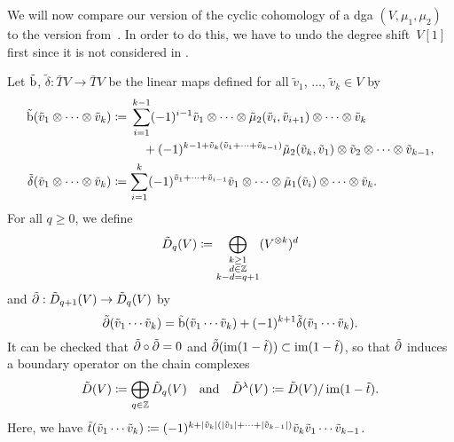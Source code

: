 \documentclass[\MainFolder/Text.tex]{subfiles}
\begin{document}
We will now compare our version of the cyclic cohomology of a dga $(V,\mu_1, \mu_2)$ to the version from~\cite[Section 5]{LodayCyclic}.
In order to do this, we have to undo the degree shift~$V[1]$ first since it is not considered in \cite{LodayCyclic}.

Let $\tilde{\mathrm{b}}$, $\tilde{\delta}: \bar{T}V \rightarrow \bar{T}V$ be the linear maps defined for all $\tilde{v}_1$, $\dotsc$, $\tilde{v}_k \in V$ by
\allowdisplaybreaks
\begin{align*}
   \tilde{\Hd}(\tilde{v}_1\otimes \dotsb \otimes \tilde{v}_k) & \coloneqq \begin{multlined}[t] \sum_{i=1}^{k-1} (-1)^{i-1} \tilde{v}_1 \otimes \dotsb \otimes \tilde{\mu}_2(\tilde{v}_i, \tilde{v}_{i+1}) \otimes \dotsb \otimes \tilde{v}_k  \\ {}+ (-1)^{k-1+ \tilde{v}_k(\tilde{v}_1 + \dotsb + \tilde{v}_{k-1})}\tilde{\mu}_2(\tilde{v}_k, \tilde{v}_1)\otimes\tilde{v}_2\otimes\dotsb\otimes\tilde{v}_{k-1}, 
\end{multlined} \\ 
\tilde{\delta}(\tilde{v}_1\otimes \dotsb \otimes \tilde{v}_k) & \coloneqq  \sum_{i=1}^k (-1)^{\tilde{v}_1 + \dotsb + \tilde{v}_{i-1}} \tilde{v}_1\otimes\dotsb \otimes \tilde{\mu}_1(\tilde{v}_i)\otimes \dotsb \otimes \tilde{v}_k.
\end{align*}
For all $q\ge 0$, we define
\begin{equation}\label{Eq:NDSComplex}
\tilde{D}_q(V) \coloneqq \bigoplus_{\substack{k\ge 1 \\ d\in \mathbb{Z} \\k-d= q + 1}} (V^{\otimes k})^d
\end{equation}
and $\tilde{\partial}: \tilde{D}_{q+1}(V) \rightarrow \tilde{D}_{q}(V)$ by   
$$ \tilde{\partial}(\tilde{v}_1\dotsb \tilde{v}_k) = \tilde{\mathrm{b}}(\tilde{v}_1\dotsb \tilde{v}_k) + (-1)^{k+1} \tilde{\delta}(\tilde{v}_1\dotsb \tilde{v}_k). $$
It can be checked that $\tilde{\partial}\circ\tilde{\partial}=0$ and $\tilde{\partial}(\operatorname{im}(1-\tilde{t}))\subset \operatorname{im}(1-\tilde{t})$, so that $\tilde{\partial}$ induces a boundary operator on
the chain complexes 
$$ \tilde{D}(V)\coloneqq \bigoplus_{q\in \mathbb{Z}} \tilde{D}_q(V)\quad\text{and}\quad\tilde{D}^\lambda(V) \coloneqq \tilde{D}(V)/\operatorname{im}(1-\tilde{t}). $$
Here, we have $\tilde{t}(\tilde{v}_1 \dotsb \tilde{v}_k) \coloneqq (-1)^{k + |\tilde{v}_k|(|\tilde{v}_1| + \dotsb + |\tilde{v}_{k-1}|)} \tilde{v}_k \tilde{v}_1 \dotsb \tilde{v}_{k-1}$.
\end{document}
